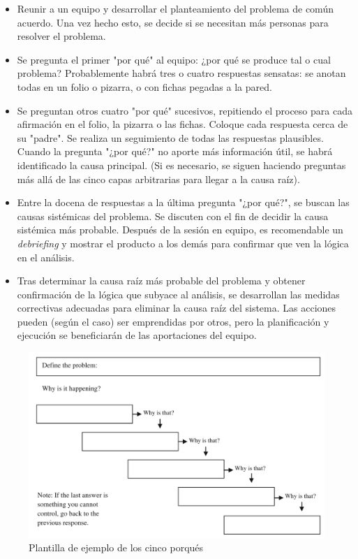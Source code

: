 \begin{itemize}
    \item Reunir a un equipo y desarrollar el planteamiento del problema de común acuerdo. Una vez hecho esto, se decide si se necesitan más personas para resolver el problema.
    \item Se pregunta el primer "por qué" al equipo: ¿por qué se produce tal o cual problema? Probablemente habrá tres o cuatro respuestas sensatas: se anotan todas en un folio o pizarra, o con fichas pegadas a la pared.
    \item Se preguntan otros cuatro "por qué" sucesivos, repitiendo el proceso para cada afirmación en el folio, la pizarra o las fichas. Coloque cada respuesta cerca de su "padre". Se realiza un seguimiento de todas las respuestas plausibles. Cuando la pregunta "¿por qué?" no aporte más información útil, se habrá identificado la causa principal. (Si es necesario, se siguen haciendo preguntas más allá de las cinco capas arbitrarias para llegar a la causa raíz).
    \item Entre la docena de respuestas a la última pregunta "¿por qué?", se buscan las causas sistémicas del problema. Se discuten con el fin de decidir la causa sistémica más probable. Después de la sesión en equipo, es recomendable un \textit{debriefing} y mostrar el producto a los demás para confirmar que ven la lógica en el análisis.
    \item Tras determinar la causa raíz más probable del problema y obtener confirmación de la lógica que subyace al análisis, se desarrollan las medidas correctivas adecuadas para eliminar la causa raíz del sistema. Las acciones pueden (según el caso) ser emprendidas por otros, pero la planificación y ejecución se beneficiarán de las aportaciones del equipo.
\end{itemize}

\begin{figure}
    \centering
    \includegraphics[width=\textwidth]{img/five-whys.png}
    \caption{Plantilla de ejemplo de los cinco porqués}
    \label{fig:five-whys}
\end{figure}

